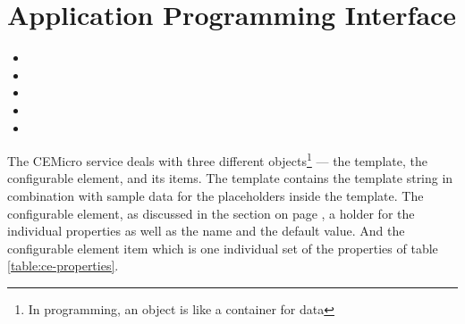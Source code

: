 \section{Application Programming Interface}
\label{sec:impl:api}

\begin{itemize}
  \item {}
  \item {}
  \item {}
  \item {}
  \item {}
\end{itemize}

The CEMicro service deals with three different objects\footnote{In programming, an object is like a container for data} — the template, the configurable element, and its items. The template contains the template string in combination with sample data for the placeholders inside the template. The configurable element, as discussed in the section on page \pageref{sec:arch:understanding}, a holder for the individual properties as well as the name and the default value. And the configurable element item which is one individual set of the properties of table \ref{table:ce-properties}.


